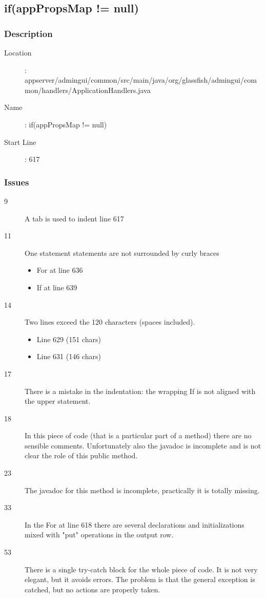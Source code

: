 \subsection{if(appPropsMap != null)}
	\subsubsection{Description}
	\begin{description}
	\item[Location]: appserver/admingui/common/src/main/java/org/glassfish/admingui/common/handlers/ApplicationHandlers.java
	\item[Name]: if(appPropsMap != null)
	\item[Start Line]: 617
	\end{description}
	\subsubsection{Issues}
	\begin{description}
		\item[9] A tab is used to indent line 617
		\item[11] One statement statements are not surrounded by curly braces
		\begin{itemize}
			\item For at line 636
			\item If at line 639
		\end{itemize}
		\item[14] Two lines exceed the 120 characters (spaces included).
		\begin{itemize}
			\item Line 629 (151 chars)
			\item Line 631 (146 chars)
		\end{itemize}
		\item[17] There is a mistake in the indentation: the wrapping If is not aligned with the upper statement.
		\item[18] In this piece of code (that is a particular part of a method) there are no sensible comments.
		Unfortunately also the javadoc is incomplete and is not clear the role of this public method.
		\item[23] The javadoc for this method is incomplete, practically it is totally missing.
		\item[33] In the For at line 618 there are several declarations and initializations mixed with "put"
		operations in the output row.
		\item[53] There is a single try-catch block for the whole piece of code. It is not very elegant, but
		it avoids errors. The problem is that the general exception is catched, but no actions are properly taken.
	\end{description}